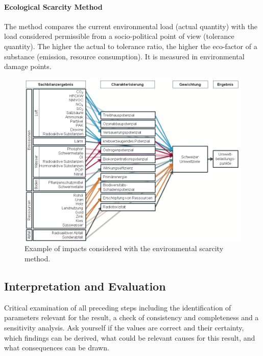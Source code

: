 \documentclass[11pt]{article}
\theoremstyle{definition}
\begin{document}
\paragraph{Ecological Scarcity Method} The method compares the current environmental load (actual quantity) with the load considered permissible from a socio-political point of view (tolerance quantity). The higher the actual to tolerance ratio, the higher the eco-factor of a substance (emission, resource consumption). It is measured in environmental damage points.

\begin{figure}[H]
	\centering
	\includegraphics[width=0.8\linewidth]{img/ecological_scarcity_method_example}
	\caption{Example of impacts considered with the environmental scarcity method.}
	\label{fig:ecologicalscarcitymethodexample}
\end{figure}

\subsection{Interpretation and Evaluation}
Critical examination of all preceding steps including the identification of parameters relevant for the result, a check of consistency and completeness and a sensitivity analysis. Ask yourself if the values are correct and their certainty, which findings can be derived, what could be relevant causes for this result, and what consequences can be drawn.
\end{document}
